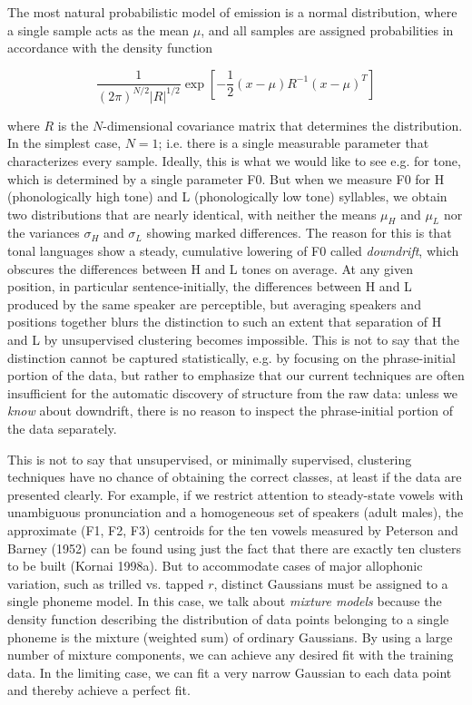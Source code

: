 The most natural probabilistic model of emission is a normal distribution,
where a single sample acts as the mean $\mu$, and all samples are assigned
probabilities in accordance with the density function

\begin{equation}
\frac{1}{(2\pi)^{N/2}|R|^{1/2}}\exp\left[-\frac{1}{2}(x-\mu)R^{-1}(x-\mu)^T\right]
\end{equation}

\noindent
where $R$ is the $N$-dimensional covariance matrix that determines the
distribution.  In the simplest case, $N=1$; i.e. there is a single measurable
parameter that characterizes every sample. Ideally, this is what we would like
to see e.g. for tone, which is determined by a single parameter F0. But when
we measure F0 for H (phonologically high tone) and L (phonologically low tone)
syllables, we obtain two distributions that are nearly identical, with neither
the means $\mu_H$ and $\mu_L$ nor the variances $\sigma_H$ and $\sigma_L$
showing marked differences. The reason for this is that tonal languages show a
steady, cumulative lowering of F0 called {\it downdrift},
which obscures the differences between H and L tones on average.  At any given
position, in particular sentence-initially, the differences between H and L
produced by the same speaker are perceptible, but averaging speakers and
positions together blurs the distinction to such an extent that separation of
H and L by unsupervised clustering becomes impossible. This is not to say that
the distinction cannot be captured statistically, e.g. by focusing on the
phrase-initial portion of the data, but rather to emphasize that our current 
techniques are often insufficient for the automatic discovery of structure 
from the raw data: unless we {\it know} about downdrift, there is no reason 
to inspect the phrase-initial portion of the data separately. 

This is not to say that unsupervised, or minimally supervised, clustering
techniques have no chance of obtaining the correct classes, at least if the
data are presented clearly. For example, if we restrict attention to
steady-state vowels with unambiguous pronunciation and a homogeneous set of
speakers (adult males), the approximate (F1, F2, F3) centroids for the ten
vowels measured by Peterson and Barney (1952) can be found using just the fact
that there are exactly ten clusters to be built (Kornai
1998a).\nocite{Kornai:1996} But to accommodate cases of major allophonic
variation, such as trilled vs.  tapped $r$, distinct Gaussians must be
assigned to a single phoneme model. In this case, we talk about {\it mixture
  models} because the density function describing the distribution of data
points belonging to a single phoneme is the mixture (weighted sum) of ordinary
Gaussians. By using a large number of mixture components, we can achieve any
desired fit with the training data. In the limiting case, we can fit a very
narrow Gaussian to each data point and thereby achieve a perfect fit.

